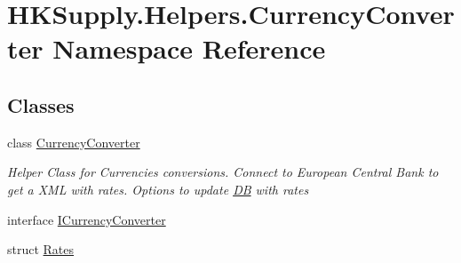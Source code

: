 \hypertarget{namespace_h_k_supply_1_1_helpers_1_1_currency_converter}{}\section{H\+K\+Supply.\+Helpers.\+Currency\+Converter Namespace Reference}
\label{namespace_h_k_supply_1_1_helpers_1_1_currency_converter}
\subsection*{Classes}
\begin{DoxyCompactItemize}
\item 
class \mbox{\hyperlink{class_h_k_supply_1_1_helpers_1_1_currency_converter_1_1_currency_converter}{Currency\+Converter}}
\begin{DoxyCompactList}\small\item\em Helper Class for Currencies conversions. Connect to European Central Bank to get a X\+ML with rates. Options to update \mbox{\hyperlink{namespace_h_k_supply_1_1_d_b}{DB}} with rates \end{DoxyCompactList}\item 
interface \mbox{\hyperlink{interface_h_k_supply_1_1_helpers_1_1_currency_converter_1_1_i_currency_converter}{I\+Currency\+Converter}}
\item 
struct \mbox{\hyperlink{struct_h_k_supply_1_1_helpers_1_1_currency_converter_1_1_rates}{Rates}}
\end{DoxyCompactItemize}
